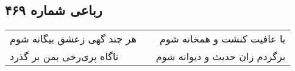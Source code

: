\begin{center}
\section*{رباعی شماره ۴۶۹}
\label{sec:sh469}
\begin{longtable}{l p{0.5cm} r}
هر چند گهی زعشق بیگانه شوم
&&
با عافیت کنشت و همخانه شوم
\\
ناگاه پری‌رخی بمن بر گذرد
&&
برگردم زان حدیث و دیوانه شوم
\\
\end{longtable}
\end{center}
